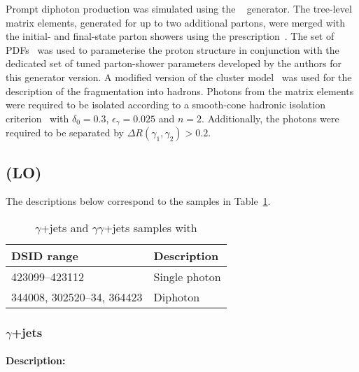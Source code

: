 Prompt diphoton production was simulated using the \SHERPA[2.1]~\cite{Bothmann:2019yzt}
generator. The tree-level matrix elements, generated for up to two
additional partons, were merged with the initial- and final-state parton showers using the
\MEPSatLO prescription~\cite{Hoeche:2009rj}. The \CT[10nlo] set of PDFs~\cite{Lai:2010vv} was
used to parameterise the proton structure in conjunction with the dedicated set of tuned
parton-shower parameters developed by the \SHERPA authors for this generator version. A
modified version of the cluster model~\cite{Winter:2003tt} was used
for the description of the fragmentation into hadrons. Photons from the matrix elements were
required to be isolated according to a smooth-cone hadronic isolation criterion~\cite{Frixione:1998jh}
with $\delta_0=0.3$, $\epsilon_{\gamma}=0.025$ and $n=2$. Additionally, the photons were 
required to be separated by $\Delta R(\gamma_1,\gamma_2) > 0.2$.

\subsection[Pythia (LO)]{\PYTHIA (LO)}

The descriptions below correspond to the samples in Table~\ref{tab:gammajets-pythia-lo}.
\begin{table}[!htbp]
\begin{center}
\caption{$\gamma$+jets and  $\gamma\gamma$+jets samples with \PYTHIA}
\label{tab:gammajets-pythia-lo}
\begin{tabular}{ l | l }
\hline
DSID range & Description \\
\hline
423099--423112 &  Single photon \\
344008, 302520--34, 364423 &  Diphoton \\
\hline
\end{tabular}
\end{center}
\end{table}



\subsubsection[y+jets]{$\gamma$+jets}

\paragraph{Description:}

